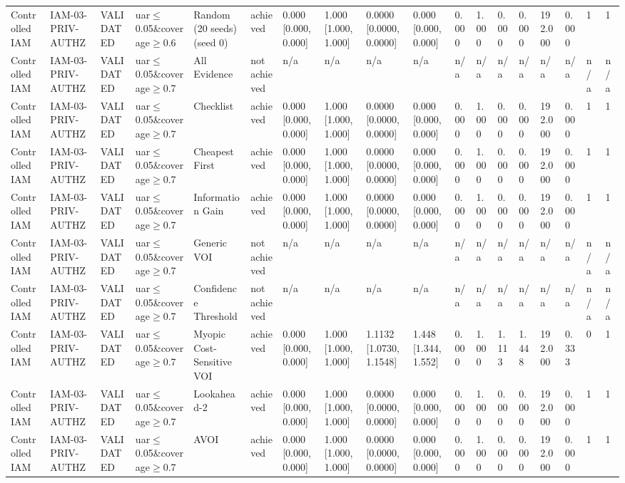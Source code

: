 \begin{table}[!ht]
{\begin{tabular}{llllllllllllllllll}
Controlled IAM & IAM-03-PRIV-AUTHZ & VALIDATED & uar$\le$0.05\&coverage$\ge$0.6 & Random (20 seeds) (seed 0) & achieved & 0.000 [0.000, 0.000] & 1.000 [1.000, 1.000] & 0.0000 [0.0000, 0.0000] & 0.000 [0.000, 0.000] & 0.000 & 1.000 & 0.000 & 0.000 & 192.000 & 0.000 & 1 & 1 \\
Controlled IAM & IAM-03-PRIV-AUTHZ & VALIDATED & uar$\le$0.05\&coverage$\ge$0.7 & All Evidence & not achieved & n/a & n/a & n/a & n/a & n/a & n/a & n/a & n/a & n/a & n/a & n/a & n/a \\
Controlled IAM & IAM-03-PRIV-AUTHZ & VALIDATED & uar$\le$0.05\&coverage$\ge$0.7 & Checklist & achieved & 0.000 [0.000, 0.000] & 1.000 [1.000, 1.000] & 0.0000 [0.0000, 0.0000] & 0.000 [0.000, 0.000] & 0.000 & 1.000 & 0.000 & 0.000 & 192.000 & 0.000 & 1 & 1 \\
Controlled IAM & IAM-03-PRIV-AUTHZ & VALIDATED & uar$\le$0.05\&coverage$\ge$0.7 & Cheapest First & achieved & 0.000 [0.000, 0.000] & 1.000 [1.000, 1.000] & 0.0000 [0.0000, 0.0000] & 0.000 [0.000, 0.000] & 0.000 & 1.000 & 0.000 & 0.000 & 192.000 & 0.000 & 1 & 1 \\
Controlled IAM & IAM-03-PRIV-AUTHZ & VALIDATED & uar$\le$0.05\&coverage$\ge$0.7 & Information Gain & achieved & 0.000 [0.000, 0.000] & 1.000 [1.000, 1.000] & 0.0000 [0.0000, 0.0000] & 0.000 [0.000, 0.000] & 0.000 & 1.000 & 0.000 & 0.000 & 192.000 & 0.000 & 1 & 1 \\
Controlled IAM & IAM-03-PRIV-AUTHZ & VALIDATED & uar$\le$0.05\&coverage$\ge$0.7 & Generic VOI & not achieved & n/a & n/a & n/a & n/a & n/a & n/a & n/a & n/a & n/a & n/a & n/a & n/a \\
Controlled IAM & IAM-03-PRIV-AUTHZ & VALIDATED & uar$\le$0.05\&coverage$\ge$0.7 & Confidence Threshold & not achieved & n/a & n/a & n/a & n/a & n/a & n/a & n/a & n/a & n/a & n/a & n/a & n/a \\
Controlled IAM & IAM-03-PRIV-AUTHZ & VALIDATED & uar$\le$0.05\&coverage$\ge$0.7 & Myopic Cost-Sensitive VOI & achieved & 0.000 [0.000, 0.000] & 1.000 [1.000, 1.000] & 1.1132 [1.0730, 1.1548] & 1.448 [1.344, 1.552] & 0.000 & 1.000 & 1.113 & 1.448 & 192.000 & 0.333 & 0 & 1 \\
Controlled IAM & IAM-03-PRIV-AUTHZ & VALIDATED & uar$\le$0.05\&coverage$\ge$0.7 & Lookahead-2 & achieved & 0.000 [0.000, 0.000] & 1.000 [1.000, 1.000] & 0.0000 [0.0000, 0.0000] & 0.000 [0.000, 0.000] & 0.000 & 1.000 & 0.000 & 0.000 & 192.000 & 0.000 & 1 & 1 \\
Controlled IAM & IAM-03-PRIV-AUTHZ & VALIDATED & uar$\le$0.05\&coverage$\ge$0.7 & AVOI & achieved & 0.000 [0.000, 0.000] & 1.000 [1.000, 1.000] & 0.0000 [0.0000, 0.0000] & 0.000 [0.000, 0.000] & 0.000 & 1.000 & 0.000 & 0.000 & 192.000 & 0.000 & 1 & 1 \\

\end{tabular}}
\end{table}
